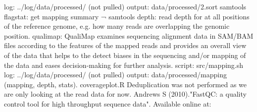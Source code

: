 \markdownRendererUlItem log: ../log/data/processed/ (not pulled)\markdownRendererUlItemEnd 
\markdownRendererUlItem output: data/processed/2.sort\markdownRendererUlItemEnd 
\markdownRendererUlEndTight \markdownRendererInterblockSeparator
{}\markdownRendererInterblockSeparator
{}samtools flagstat: get mapping summary ¬ samtools depth: read depth for at all positions of the reference genome, e.g. how many reads are overlapping the genomic position. qualimap: QualiMap examines sequencing alignment data in SAM/BAM files according to the features of the mapped reads and provides an overall view of the data that helps to the detect biases in the sequencing and/or mapping of the data and eases decision-making for further analysis.\markdownRendererInterblockSeparator
{}\markdownRendererUlBeginTight
\markdownRendererUlItem script: src/mapping.sh\markdownRendererUlItemEnd 
\markdownRendererUlItem log: ../log/data/processed/ (not pulled)\markdownRendererUlItemEnd 
\markdownRendererUlItem output: data/processed/mapping (mapping, depth, stats).\markdownRendererUlItemEnd 
\markdownRendererUlEndTight \markdownRendererInterblockSeparator
{}\markdownRendererInterblockSeparator
{}coverage\markdownRendererUnderscore{}plot.R\markdownRendererInterblockSeparator
{}\markdownRendererInterblockSeparator
{}Deduplication was not performed as we are only looking at the read data for now.\markdownRendererInterblockSeparator
{}\markdownRendererInterblockSeparator
{}Andrews S (2010)."FastQC: a quality control tool for high throughput sequence data". Available online at: \relax